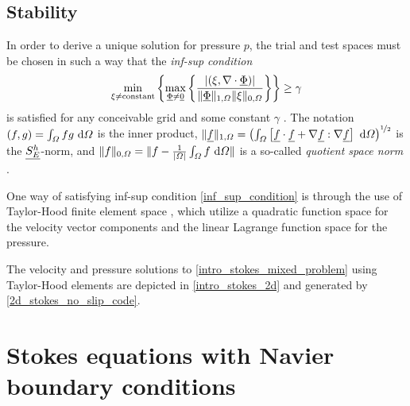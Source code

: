 \subsection{Stability}

In order to derive a unique solution for pressure $p$, the trial and test spaces must be chosen in such a way that the \emph{inf-sup condition}
\begin{align}
  \label{inf_sup_condition}
  \min_{\xi \neq \text{constant}} \left\{ \max_{\underline{\Phi} \neq \underline{0}} \left\{ \frac{\left| \left( \xi, \nabla \cdot \underline{\Phi} \right) \right|}{\Vert \underline{\Phi} \Vert_{1,\varOmega} \Vert \xi \Vert_{0,\varOmega} } \right\} \right\} \geq \gamma
\end{align}
is satisfied for any conceivable grid and some constant $\gamma$ \citep{elman_2005}.  The notation $(f,g) = \int_{\varOmega} f g \ \mathrm{d}\varOmega$ is the inner product, $\Vert \underline{f} \Vert_{1,\varOmega} = \left( \int_{\varOmega} \left[ \underline{f} \cdot \underline{f} + \nabla \underline{f} : \nabla \underline{f} \right] \ \mathrm{d}\varOmega \right)^{\nicefrac{1}{2}}$ is the $\underline{S_E^h}$-norm, and $\Vert f \Vert_{0,\varOmega} = \Vert f - \frac{1}{|\varOmega|} \int_{\varOmega} f \ \mathrm{d}\varOmega \Vert$ is a so-called \emph{quotient space norm} \citep{elman_2005}.

One way of satisfying inf-sup condition \cref{inf_sup_condition} is through the use of Taylor-Hood finite element space \citep{taylor_1973}, which utilize a quadratic function space for the velocity vector components and the linear Lagrange function space for the pressure.

The velocity and pressure solutions to \cref{intro_stokes_mixed_problem} using Taylor-Hood elements are depicted in \cref{intro_stokes_2d} and generated by \cref{2d_stokes_no_slip_code}.

\section{Stokes equations with Navier boundary conditions} \label{ssn_intro_stokes_2d_slip}

